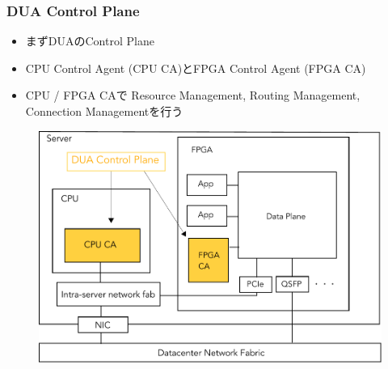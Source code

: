 \documentclass[dvipdfmx,9pt,notheorems]{beamer}
\theoremstyle{definition}
\begin{document}
\begin{frame}\frametitle{DUA Control Plane}
	\begin{itemize}
		\item まずDUAのControl Plane
		\item CPU Control Agent (CPU CA)とFPGA Control Agent (FPGA CA)
		\item CPU / FPGA CAで{\color{red} Resource Management, Routing Management, Connection Management}を行う
	\end{itemize}
  \begin{figure}[htb]
		\includegraphics[scale=0.4]{fig/ez_DUA_ControlPlane.pdf}
  \end{figure}
\end{frame}
\end{document}
